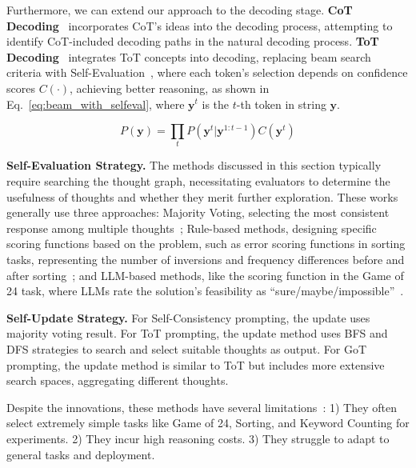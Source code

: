 \documentclass[lettersize,journal]{IEEEtran}
\begin{document}

Furthermore, we can extend our approach to the decoding stage. \textbf{CoT Decoding}~\cite{CoT_24_arXiv_Google} incorporates CoT's ideas into the decoding process, attempting to identify CoT-included decoding paths in the natural decoding process. \textbf{ToT Decoding}~\cite{SelfEvaluation_23_NeuIPS_NUS} integrates ToT concepts into decoding, replacing beam search criteria with Self-Evaluation~\cite{TheoryKnowKnow_22_arXiv_Anthropic}, where each token's selection depends on confidence scores $C(\cdot)$, achieving better reasoning, as shown in Eq.~\ref{eq:beam_with_selfeval}, where $\boldsymbol{y}^t$ is the $t$-th token in string $\boldsymbol{y}$.

\begin{equation}
    P(\boldsymbol{y}) = \prod_t P(\boldsymbol{y}^t | \boldsymbol{y}^{1:t-1})C(\boldsymbol{y}^t)
    \label{eq:beam_with_selfeval}
\end{equation}

\textbf{Self-Evaluation Strategy.} The methods discussed in this section typically require searching the thought graph, necessitating evaluators to determine the usefulness of thoughts and whether they merit further exploration. These works generally use three approaches: Majority Voting, selecting the most consistent response among multiple thoughts~\cite{SelfConsistency_23_ICLR_Google}; Rule-based methods, designing specific scoring functions based on the problem, such as error scoring functions in sorting tasks, representing the number of inversions and frequency differences before and after sorting~\cite{GoT_24_AAAI_ETH}; and LLM-based methods, like the scoring function in the Game of 24 task, where LLMs rate the solution's feasibility as ``sure/maybe/impossible''~\cite{ToT_23_NeuIPS_Princeton}.

\textbf{Self-Update Strategy.} For Self-Consistency prompting, the update uses majority voting result. For ToT prompting, the update method uses BFS and DFS strategies to search and select suitable thoughts as output. For GoT prompting, the update method is similar to ToT but includes more extensive search spaces, aggregating different thoughts.

Despite the innovations, these methods have several limitations~\cite{SurveyXofThought_24_arXiv_ETH}: 1) They often select extremely simple tasks like Game of 24, Sorting, and Keyword Counting for experiments. 2) They incur high reasoning costs. 3) They struggle to adapt to general tasks and deployment.
\end{document}
